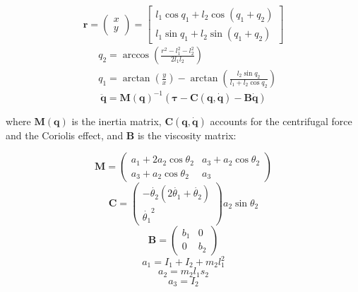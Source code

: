 \begin{equation}
\bm{r} =\left(\begin{matrix} x\\y \end{matrix}\right) %
= \left[ \begin{matrix}  l_1\cos{q_1} + l_2\cos{(q_1+q_2)} \\ l_1\sin{q_1} + l_2\sin{(q_1+q_2)}  \end{matrix} \right]
\end{equation}
\begin{equation}
\begin{split}
& q_2 = \arccos{\left(\frac{r^2-l_1^2-l_2^2}{2l_1l_2}\right)} \\
& q_1 = \arctan{\left( \frac{y}{x} \right)} - \arctan{\left(\frac{l_2\sin{q_2}}{l_1+l_2\cos q_2 }\right)}
\end{split}
\end{equation}
\begin{equation} \label{dynamics}
\ddot{\bm{q}} = \bm{M}(\bm{q})^{-1} (\bm{\tau} - \bm{C}(\bm{q}, \dot{\bm{q}}) - \bm{B}\dot{\bm{q}})
\end{equation}

where $\bm{M}(\bm{q})$ is the inertia matrix, $\bm{C}(\bm{q}, \dot{\bm{q}})$ accounts for the centrifugal force and the Coriolis effect, and $\bm{B}$ is the viscosity matrix:

\begin{equation}
\bm{M} = \left( \begin{matrix} a_1 + 2a_2\cos\theta_2  &  a_3 + a_2 \cos\theta_2 \\
a_3 + a_2 \cos\theta_2   &  a_3
\end{matrix}\right)
\end{equation}
\begin{equation}
\bm{C} = \left( \begin{matrix} -\dot{\theta_2}(2\dot{\theta_1}+\dot{\theta_2}) \\
\dot{\theta_1}^2	\end{matrix} \right)
a_2\sin{\theta_2}
\end{equation}
\begin{equation}
\bm{B} = \left( \begin{matrix} b_1  & 0 \\ 0 & b_2 \end{matrix} \right)
\end{equation}
\begin{equation}
a_1 = I_1 + I_2 + m_2 l_1^2
\end{equation}
\begin{equation}
a_2 = m_2 l_1 s_2
\end{equation}
\begin{equation}
a_3 = I_2
\end{equation}

